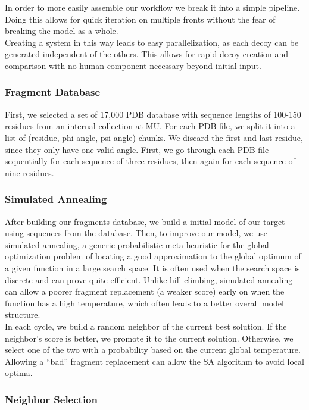 \documentclass{article}
\begin{document}
In order to more easily assemble our workflow we break it into a simple pipeline. Doing this allows for quick iteration on multiple fronts without the fear of breaking the model as a whole.\\

Creating a system in this way leads to easy parallelization, as each decoy can be generated independent of the others. This allows for rapid decoy creation and comparison with no human component necessary beyond initial input.


\subsubsection{Fragment Database}

First, we selected a set of 17,000 PDB database with sequence lengths of 100-150 residues from an internal collection at MU.  For each PDB file, we split it into a list of (residue, phi angle, psi angle) chunks.  We discard the first and last residue, since they only have one valid angle.  First, we go through each PDB file sequentially for each sequence of three residues, then again for each sequence of nine residues.


\subsubsection{Simulated Annealing}

After building our fragments database, we build a initial model of our target using sequences from the database. Then, to improve our model, we use simulated annealing, a generic probabilistic meta-heuristic for the global optimization problem of locating a good approximation to the global optimum of a given function in a large search space. It is often used when the search space is discrete and can prove quite efficient. Unlike hill climbing, simulated annealing can allow a poorer fragment replacement (a weaker score) early on when the function has a high temperature, which often leads to a better overall model structure.\\

In each cycle, we build a random neighbor of the current best solution. If the neighbor’s score is better, we promote it to  the current solution. Otherwise, we select one of the two with a probability based on the current global temperature.  Allowing a “bad” fragment replacement can allow the SA algorithm to avoid local optima.


\subsubsection{Neighbor Selection}
\end{document}
